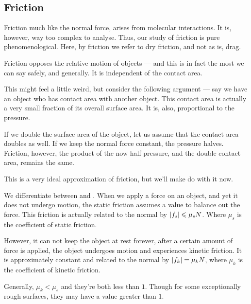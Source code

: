 \subsection{Friction}

Friction much like the normal force, arises from molecular interactions.
It is, however, way too complex to analyse. Thus, our study of friction is 
pure phenomenological. Here, by friction we refer to dry friction, and not as is, drag. 

Friction opposes the relative motion of objects --- and this is in fact the most we 
can say safely, and generally. It is independent of the contact area.

This might feel a little weird, but consider the following argument --- say we have an object 
who has contact area with another object. This contact area is actually a very small fraction 
of its overall surface area. It is, also, proportional to the pressure.

If we double the surface area of the object, let us assume that the contact area doubles as well.
If we keep the normal force constant, the pressure halves. Friction, however, the 
product of the now half pressure, and the double contact area, remains the same.

This is a very ideal approximation of friction, but we'll make do with it now. 

We differentiate between  and . When we apply 
a force on an object, and yet it does not undergo motion, the static friction assumes a value 
to balance out the force. This friction is actually related to the normal by \(\abs{f_s} \leqslant \mu_sN\).
Where \(\mu_s\) is the coefficient of static friction. 

However, it can not keep the object at rest forever, after a certain amount of force is applied, 
the object undergoes motion and experiences kinetic friction. It is approximately constant 
and related to the normal by \(\abs{f_k} = \mu_kN\), where \(\mu_k\) is the coefficient of kinetic friction.

Generally, \(\mu_k < \mu_s\) and they're both less than \(1\). Though for some exceptionally rough surfaces, they
may have a value greater than \(1\).

\begin{marginfigure}
\end{marginfigure}

